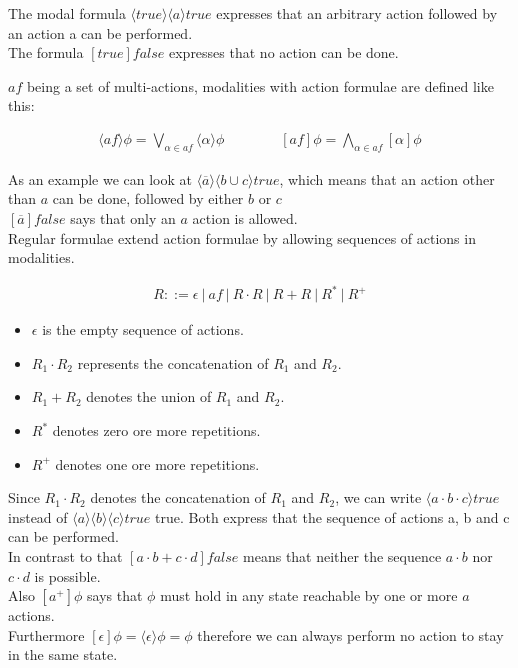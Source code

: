 \documentclass{clseminar}
\begin{document}
  The modal formula $\langle true \rangle \langle a \rangle true$ expresses that an arbitrary action followed by an action a can be performed. \\
  The formula $[true]false$ expresses that no action can be done.

  $\mathit{af}$ being a set of multi-actions, modalities with action formulae are defined like this:

  \begin{align*}
    \langle{\mathit{af}}\rangle\phi = \bigvee_{\alpha \in \mathit{af}} \langle\alpha\rangle\phi
    \qquad\qquad
    [\mathit{af}]\phi = \bigwedge_{\alpha \in \mathit{af}} [\alpha]\phi
  \end{align*}

  As an example we can look at $\langle\overline{a}\rangle\langle{b \cup c}\rangle\mathit{true}$, which means that an action other than $a$ can be done, followed by either $b$ or $c$ \\
  $[\overline{a}]\mathit{false}$ says that only an $a$ action is allowed. \\

  Regular formulae extend action formulae by allowing sequences of actions in modalities.

  \begin{align*}
    R ::= \epsilon\ |\ \mathit{af}\ |\ R\cdot{R}\ |\ R+R\ |\ R^*\ |\ R^+
  \end{align*}

  \begin{itemize}
    \item $\epsilon$ is the empty sequence of actions.
    \item $R_1\cdot{R_2}$ represents the concatenation of $R_1$ and $R_2$.
    \item $R_1+R_2$ denotes the union of  $R_1$ and $R_2$.
    \item $R^*$ denotes zero ore more repetitions.
    \item $R^+$ denotes one ore more repetitions.
  \end{itemize}

  Since $R_1\cdot{R_2}$ denotes the concatenation of $R_1$ and $R_2$, we can write $\langle a \cdot b \cdot c \rangle true$ instead of $\langle a \rangle \langle b \rangle \langle c \rangle true$ true. Both express that the sequence of actions a, b and c can be performed. \\
  In contrast to that $[a\cdot{b} + c\cdot{d}]\mathit{false}$ means that neither the sequence $a\cdot{b}$ nor $c\cdot{d}$ is possible. \\
  Also $[a^+]\phi$ says that $\phi$ must hold in any state reachable by one or more $a$ actions. \\
  Furthermore $[\epsilon]\phi = \langle \epsilon \rangle \phi = \phi$ therefore we can always perform no action to stay in the same state. \\
\end{document}

